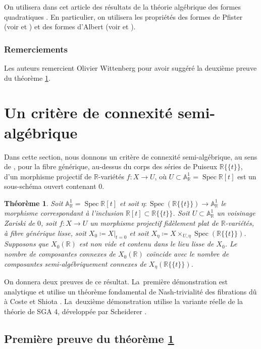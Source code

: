\documentclass[11pt]{article}
\newtheorem{thm}{Théorème}[section]
\theoremstyle{definition}
\newcommand{\R}{\mathbb R}
\newcommand{\A}{\mathbb A}
\newcommand{\Spec}{\operatorname{Spec}}
\newcommand{\puiseux}{\mathbb{R}\{\!\{t\}\!\}}
\begin{document}
On utilisera dans cet article des résultats de la théorie algébrique des formes quadratiques \cite{lam2005introduction, kahn2008formes}. En particulier, on utilisera les propriétés des formes de Pfister (voir \cite[Ch.\,X]{lam2005introduction} et \cite[Ch.\,2]{kahn2008formes}) et des formes d'Albert (voir \cite[(4.7) p.\,69, Albert's Th.\,4.8]{lam2005introduction} et \cite[Déf.\,5.7.7, Lem.\,8.1.4]{kahn2008formes}).

\subsubsection*{Remerciements}
Les auteurs remercient Olivier Wittenberg pour avoir suggéré la deuxième preuve du théorème \ref{critere-connexe}.

\section{Un critère de connexité semi-algébrique}\label{ehres}

Dans cette section, nous donnons un critère de connexité semi-algébrique, au sens de \cite[Def.\,2.4.2]{bochnak1998real}, pour la fibre générique, au-dessus du corps des séries de Puiseux $\puiseux$, d'un morphisme projectif de $\R$-variétés $f\colon X\to U$, où $U\subset \A^1_\R=\Spec \R[t]$ est un sous-schéma ouvert contenant $0$.

\begin{thm}\label{critere-connexe}
Soit $\A^1_\R=\Spec \R[t]$ et soit $\eta\colon \Spec(\puiseux)\to \A^1_\R$ le morphisme correspondant à l'inclusion $\R[t]\subset \puiseux$. Soit $U\subset \A^1_\R$ un voisinage Zariski de $0$, soit $f\colon X\to U$ un morphisme projectif fidèlement plat de $\R$-variétés, à fibre générique lisse, soit $X_0\coloneqq X|_{t=0}$ et soit $X_\eta\coloneqq X\times_{U,\eta}\Spec(\puiseux)$. Supposons que $X_0(\R)$ est non vide et contenu dans le lieu lisse de $X_0$. Le nombre de composantes connexes de $X_0(\R)$ coïncide avec le nombre de composantes semi-algébriquement connexes de $X_\eta(\puiseux)$.
\end{thm}

On donnera deux preuves de ce résultat. La~première démonstration est analytique et utilise un théorème fondamental de Nash-trivialité des fibrations dû à Coste et Shiota \cite{coste1992nash}. La~deuxième démonstration utilise la variante réelle de la théorie de SGA 4, développée par Scheiderer \cite{scheiderer1994real}.

\subsection{Première preuve du théorème \ref{critere-connexe}}
\end{document}
